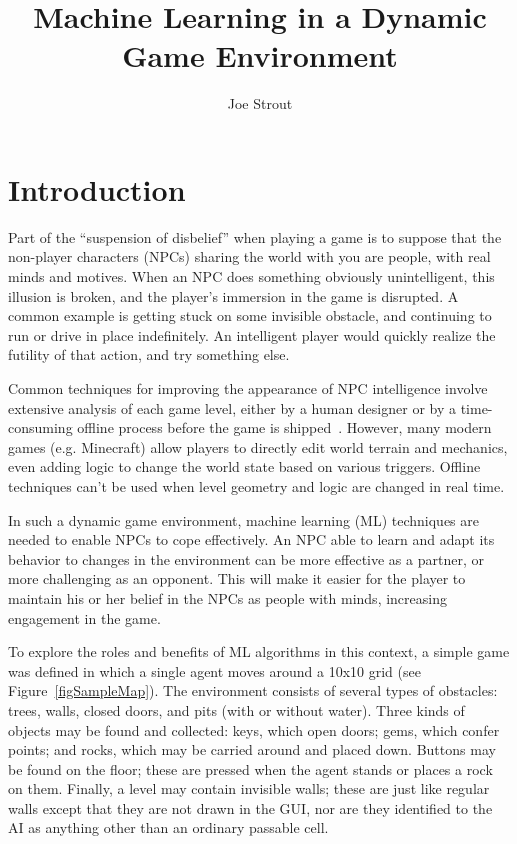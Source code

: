 \documentclass{article}
\begin{document}
\title{Machine Learning in a Dynamic Game Environment}
\author{Joe Strout}
\maketitle

\noindent\hrulefill
\vspace{-5mm} %
\tableofcontents
\noindent\hrulefill

\section{Introduction}

Part of the ``suspension of disbelief'' when playing a game is to suppose that the non-player characters (NPCs) sharing the world with you are people, with real minds and motives.  When an NPC does something obviously unintelligent, this illusion is broken, and the player's immersion in the game is disrupted.  A common example is getting stuck on some invisible obstacle, and continuing to run or drive in place indefinitely.  An intelligent player would quickly realize the futility of that action, and try something else.

Common techniques for improving the appearance of NPC intelligence involve extensive analysis of each game level, either by a human designer or by a time-consuming offline process before the game is shipped~\cite{AIFORGAMES}.  However, many modern games (e.g. Minecraft) allow players to directly edit world terrain and mechanics, even adding logic to change the world state based on various triggers.  Offline techniques can't be used when level geometry and logic are changed in real time.

In such a dynamic game environment, machine learning (ML) techniques are needed to enable NPCs to cope effectively.  An NPC able to learn and adapt its behavior to changes in the environment can be more effective as a partner, or more challenging as an opponent.  This will make it easier for the player to maintain his or her belief in the NPCs as people with minds, increasing engagement in the game.

To explore the roles and benefits of ML algorithms in this context, a simple game was defined in which a single agent moves around a 10x10 grid (see Figure~\ref{figSampleMap}).  The environment consists of several types of obstacles: trees, walls, closed doors, and pits (with or without water).  Three kinds of objects may be found and collected: keys, which open doors; gems, which confer points; and rocks, which may be carried around and placed down.  Buttons may be found on the floor; these are pressed when the agent stands or places a rock on them.  Finally, a level may contain invisible walls; these are just like regular walls except that they are not drawn in the GUI, nor are they identified to the AI as anything other than an ordinary passable cell.
\end{document}
